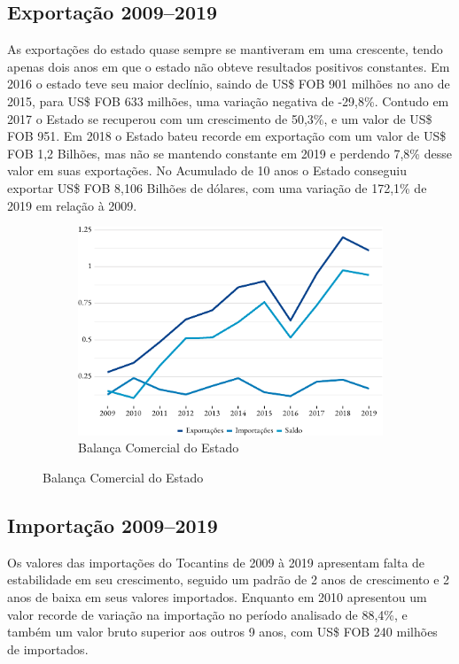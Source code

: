 \subsection{Exportação 2009--2019}
\par As exportações do estado quase sempre se mantiveram em uma crescente, tendo
apenas dois anos em que o estado não obteve resultados positivos constantes. Em 2016 o estado teve seu maior declínio, saindo de US\$ FOB 901 milhões no ano de 2015, para US\$ FOB 633 milhões, uma variação negativa de  -29,8\%. 
Contudo em 2017 o Estado se recuperou com um crescimento de 50,3\%, e um valor de US\$ FOB 951. Em 2018 o Estado bateu recorde em exportação com um valor de US\$ FOB 1,2 Bilhões, mas não se mantendo constante em 2019 e perdendo 7,8\% desse valor em suas exportações.
No Acumulado de 10 anos o Estado conseguiu exportar US\$ FOB 8,106 Bilhões de dólares, com uma variação de 172,1\% de 2019 em relação à 2009.

\begin{figure}[!h]
		\begin{subfigure}{\linewidth}
		\caption{Balança Comercial do Estado}
		\includegraphics{fig/total-1.pdf}
	\end{subfigure}
\end{figure}

\subsection{Importação 2009--2019}
\par Os valores das importações do Tocantins de 2009 à 2019 apresentam falta de estabilidade em seu crescimento, seguido um padrão de 2 anos de crescimento e 2 anos de baixa em seus valores importados. Enquanto em 2010 apresentou um valor recorde de variação na importação no período analisado de 88,4\%, e também um valor bruto superior aos outros 9 anos, com US\$ FOB 240 milhões de importados.

